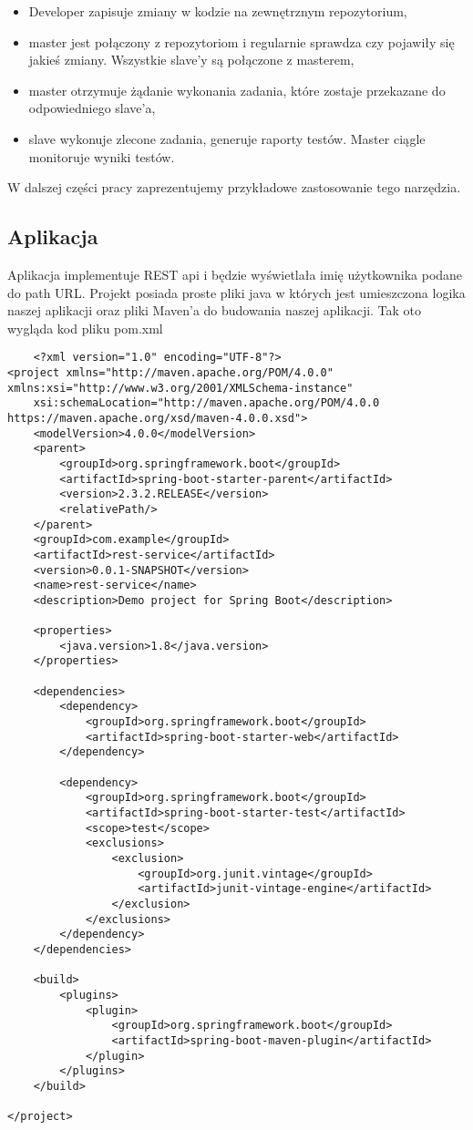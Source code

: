 \begin{itemize}
    \item Developer zapisuje zmiany w kodzie na zewnętrznym repozytorium,
    \item master jest połączony z repozytoriom i regularnie sprawdza czy pojawiły się jakieś zmiany. Wszystkie slave'y są połączone z masterem,
    \item master otrzymuje żądanie wykonania zadania, które zostaje przekazane do odpowiedniego slave'a,
    \item slave wykonuje zlecone zadania, generuje raporty testów. Master ciągle monitoruje wyniki testów.
\end{itemize}

W dalszej części pracy zaprezentujemy przykładowe zastosowanie tego narzędzia. 

\subsection{Aplikacja}

Aplikacja implementuje REST api i będzie wyświetlała imię użytkownika podane do path URL. Projekt posiada proste pliki java w których jest umieszczona logika naszej aplikacji oraz pliki Maven'a do budowania naszej aplikacji. Tak oto wygląda kod pliku pom.xml 

\begin{lstlisting}
    <?xml version="1.0" encoding="UTF-8"?>
<project xmlns="http://maven.apache.org/POM/4.0.0" xmlns:xsi="http://www.w3.org/2001/XMLSchema-instance"
	xsi:schemaLocation="http://maven.apache.org/POM/4.0.0 https://maven.apache.org/xsd/maven-4.0.0.xsd">
	<modelVersion>4.0.0</modelVersion>
	<parent>
		<groupId>org.springframework.boot</groupId>
		<artifactId>spring-boot-starter-parent</artifactId>
		<version>2.3.2.RELEASE</version>
		<relativePath/>
	</parent>
	<groupId>com.example</groupId>
	<artifactId>rest-service</artifactId>
	<version>0.0.1-SNAPSHOT</version>
	<name>rest-service</name>
	<description>Demo project for Spring Boot</description>

	<properties>
		<java.version>1.8</java.version>
	</properties>

	<dependencies>
		<dependency>
			<groupId>org.springframework.boot</groupId>
			<artifactId>spring-boot-starter-web</artifactId>
		</dependency>

		<dependency>
			<groupId>org.springframework.boot</groupId>
			<artifactId>spring-boot-starter-test</artifactId>
			<scope>test</scope>
			<exclusions>
				<exclusion>
					<groupId>org.junit.vintage</groupId>
					<artifactId>junit-vintage-engine</artifactId>
				</exclusion>
			</exclusions>
		</dependency>
	</dependencies>

	<build>
		<plugins>
			<plugin>
				<groupId>org.springframework.boot</groupId>
				<artifactId>spring-boot-maven-plugin</artifactId>
			</plugin>
		</plugins>
	</build>

</project>

\end{lstlisting}

